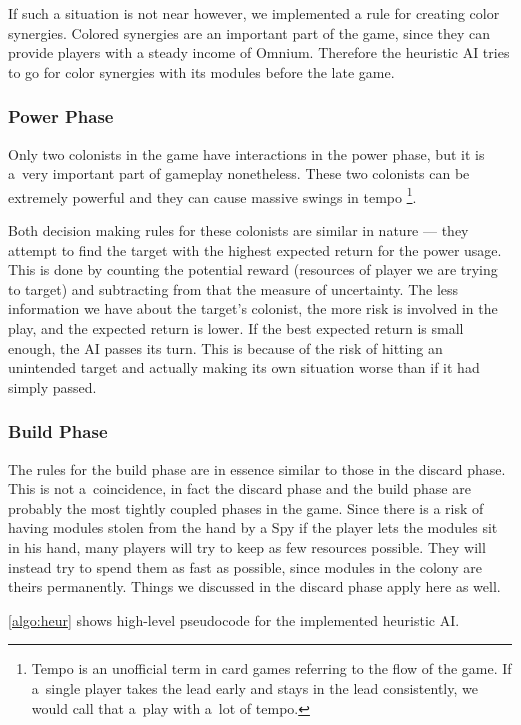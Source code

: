 If such a situation is not near however, we implemented a rule for creating color
synergies. Colored synergies are an important part of the game, since they
can provide players with a steady income of Omnium. Therefore the heuristic AI
tries to go for color synergies with its modules before the late game.

\subsubsection{Power Phase}

Only two colonists in the game have interactions in the power phase, but
it is a~very important part of gameplay nonetheless. These two colonists
can be extremely powerful and they can cause massive swings in tempo
\footnote{Tempo is an unofficial term in card games referring to the flow of the game.
If a~single player takes the lead early and stays in the lead consistently, we would
call that a~play with a~lot of tempo.}.

Both decision making rules for these colonists are similar in nature --- they attempt
to find the target with the highest expected return for the power usage.
This is done by counting the potential reward (resources of player we are trying
to target) and subtracting from that the measure of uncertainty. The less information
we have about the target's colonist, the more risk is involved in the play, and the
expected return is lower. If the best
expected return is small enough, the AI passes its turn. This is because of the risk
of hitting an unintended target and actually making its own situation worse than if
it had simply passed.

\subsubsection{Build Phase}

The rules for the build phase are in essence similar to those in the discard phase.
This is not a~coincidence, in fact the discard phase and the build phase
are probably the most tightly coupled phases in the game. Since there is a risk of
having modules stolen from the hand by a Spy if the player lets the modules
sit in his hand, many players will try to keep as few resources possible.
They will instead try to spend them as fast as possible, since modules in the colony
are theirs permanently. Things we discussed in the discard phase apply here as well.

\autoref{algo:heur} shows high-level pseudocode for
the implemented heuristic AI.

